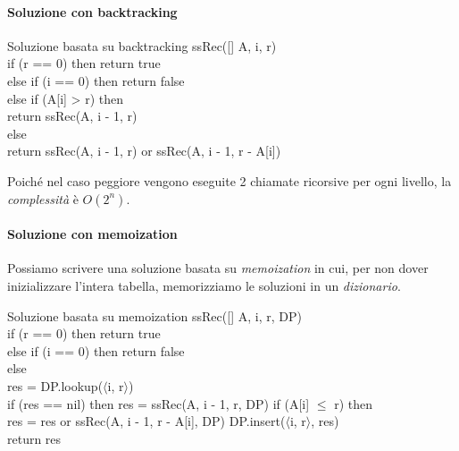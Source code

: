 \paragraph{Soluzione con backtracking}
\begin{minicode}{Soluzione basata su backtracking}
\ind{} ssRec([] A,  i,  r)\\
    \indf if (r == 0) then\hfill{}
        return true\\
    \indf else if (i == 0) then\hfill{}
        return false\\
    \indf else if (A[i] > r) then\\
        return ssRec(A, i - 1, r)\\
    \indf else \\
        return ssRec(A, i - 1, r) or ssRec(A, i - 1, r - A[i])
\end{minicode}

\noindent
Poiché nel caso peggiore vengono eseguite 2 chiamate ricorsive per ogni livello,
la \emph{complessità} è $O(2^n)$.

\paragraph{Soluzione con memoization}
Possiamo scrivere una soluzione basata su \emph{memoization} in cui, per non
dover inizializzare l'intera tabella, memorizziamo le soluzioni in un \emph{dizionario}.

\begin{minicode}{Soluzione basata su memoization}
    \ind{} ssRec([] A,  i,  r,  DP)\\
        \indf if (r == 0) then\hfill{}
            return true\\
        \indf else if (i == 0) then\hfill{}
            return false\\
        \indf else\\
             res = DP.lookup($\langle$i, r$\rangle$)\\
            \indff if (res == nil) then\hfill{}
                res = ssRec(A, i - 1, r, DP)\hfill{}
                \indfff if (A[i] $\leq$ r) then\\
                    res = res or ssRec(A, i - 1, r - A[i], DP)\hfill{}
                \indfff DP.insert($\langle$i, r$\rangle$, res)\\
            \indff return res
\end{minicode}


